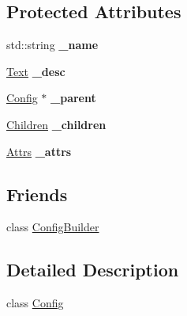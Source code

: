 \subsection*{Protected Attributes}
\begin{DoxyCompactItemize}
\item 
\mbox{\label{classtheoria_1_1config_1_1Config_a3a4838b605d99ce710ec0ad4c5285e5d}} 
std\+::string {\bfseries \+\_\+name}
\item 
\mbox{\label{classtheoria_1_1config_1_1Config_ab73d2f2163ddb788e877900ed075273e}} 
\hyperlink{classtheoria_1_1config_1_1Config_ac1325f2d355e7c617dcd16d561ee2429}{Text} {\bfseries \+\_\+desc}
\item 
\mbox{\label{classtheoria_1_1config_1_1Config_aecbf5fc3dcb43d90e8ebffd0650c3831}} 
\hyperlink{classtheoria_1_1config_1_1Config}{Config} $\ast$ {\bfseries \+\_\+parent}
\item 
\mbox{\label{classtheoria_1_1config_1_1Config_a51f52887f1e69984334896dc61b5846f}} 
\hyperlink{classtheoria_1_1config_1_1Config_acc6cccfd7dd23be9bbd053c55a1e8eb7}{Children} {\bfseries \+\_\+children}
\item 
\mbox{\label{classtheoria_1_1config_1_1Config_a9ffb513d50db0712eb085f22c2c102b2}} 
\hyperlink{classtheoria_1_1config_1_1Config_a3590578a57d530fe1e51d25b0e492f7d}{Attrs} {\bfseries \+\_\+attrs}
\end{DoxyCompactItemize}
\subsection*{Friends}
\begin{DoxyCompactItemize}
\item 
class \hyperlink{classtheoria_1_1config_1_1Config_a3d61732fded713b38fc7f9fe3d80e2ae}{Config\+Builder}
\end{DoxyCompactItemize}


\subsection{Detailed Description}
class \hyperlink{classtheoria_1_1config_1_1Config}{Config}

